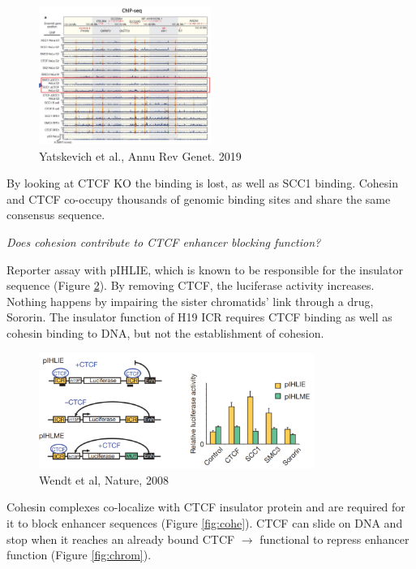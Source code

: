 \begin{figure}
\centering
\includegraphics[width=0.5\textwidth]{../_resources/Screenshot_2022-10-14_at_19-51-43.png}
\caption{Yatskevich et al., Annu Rev Genet. 2019}
\label{fig:chip}
\end{figure}

By looking at CTCF KO the binding is lost, as well as SCC1 binding. Cohesin and CTCF co-occupy thousands of genomic binding sites and share the same consensus sequence. 

\emph{Does cohesion contribute to CTCF enhancer blocking function?}

Reporter assay with pIHLIE, which is known to be responsible for the insulator sequence (Figure \ref{fig:rep}). By removing CTCF, the luciferase activity increases. Nothing happens by impairing the sister chromatids' link through a drug, Sororin. The insulator function of H19 ICR requires CTCF binding as well as cohesin binding to DNA, but not the establishment of cohesion.

\begin{figure}
\centering
\includegraphics[width=0.8\textwidth]{../_resources/Screenshot_2022-10-14_at_19-50-44.png}
\caption{Wendt et al, Nature, 2008}
\label{fig:rep}
\end{figure}

Cohesin complexes co-localize with CTCF insulator protein and are required for it to block enhancer sequences (Figure \ref{fig:cohe}). CTCF can slide on DNA and stop when it reaches an already bound CTCF $\rightarrow$ functional to repress enhancer function (Figure \ref{fig:chrom}).

